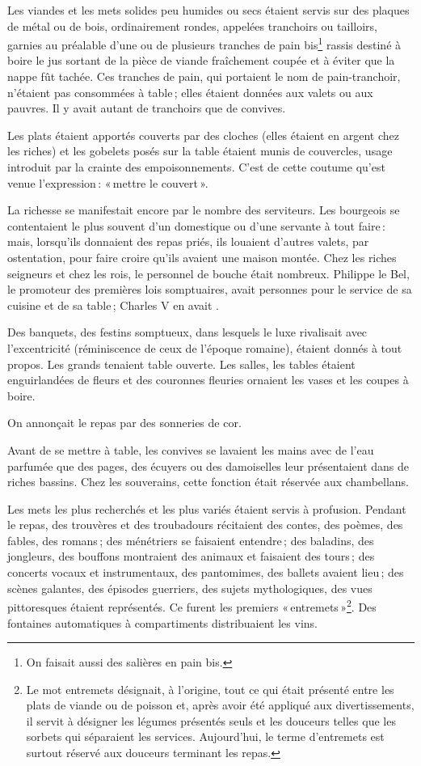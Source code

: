 Les viandes et les mets solides peu humides ou secs étaient servis sur des
plaques de métal ou de bois, ordinairement rondes, appelées tranchoirs ou
tailloirs, garnies au préalable d'une ou de plusieurs tranches de pain
bis\footnote{On faisait aussi des salières en pain bis.} rassis destiné à boire
le jus sortant de la pièce de viande fraîchement coupée et à éviter que la
nappe fût tachée. Ces tranches de pain, qui portaient le nom de pain-tranchoir,
n'étaient pas consommées à table ; elles étaient données aux valets ou aux
pauvres. Il y avait autant de tranchoirs que de convives.

Les plats étaient apportés couverts par des cloches (elles étaient en argent
chez les riches) et les gobelets posés sur la table étaient munis de
couvercles, usage introduit par la crainte des empoisonnements. C'est de cette
coutume qu'est venue l'expression : « mettre le couvert ».

La richesse se manifestait encore par le nombre des serviteurs. Les bourgeois
se contentaient le plus souvent d'un domestique ou d'une servante à tout
faire : mais, lorsqu'ils donnaient des repas priés, ils louaient d’autres
valets, par ostentation, pour faire croire qu'ils avaient une maison montée.
Chez les riches seigneurs et chez les rois, le personnel de bouche était
nombreux. Philippe le Bel, le promoteur des premières lois somptuaires, avait
{\mmm} personnes pour le service de sa cuisine et de sa table ; Charles
V en avait {\mmm}.

Des banquets, des festins somptueux, dans lesquels le luxe rivalisait avec
l'excentricité (réminiscence de ceux de l'époque romaine), étaient donnés
à tout propos. Les grands tenaient table ouverte. Les salles, les tables
étaient enguirlandées de fleurs et des couronnes fleuries ornaient les vases et
les coupes à boire.

On annonçait le repas par des sonneries de cor.

Avant de se mettre à table, les convives se lavaient les mains avec de l'eau
parfumée que des pages, des écuyers ou des damoiselles leur présentaient dans
de riches bassins. Chez les souverains, cette fonction était réservée aux
chambellans.

Les mets les plus recherchés et les plus variés étaient servis à profusion.
Pendant le repas, des trouvères et des troubadours récitaient des contes, des
poèmes, des fables, des romans ; des ménétriers se faisaient entendre ; des
baladins, des jongleurs, des bouffons montraient des animaux et faisaient des
tours ; des concerts vocaux et instrumentaux, des pantomimes, des ballets
avaient lieu ; des scènes galantes, des épisodes guerriers, des sujets
mythologiques, des vues pittoresques étaient représentés. Ce furent les
premiers « entremets »\footnote{Le mot entremets désignait, à l'origine, tout
ce qui était présenté entre les plats de viande ou de poisson et, après avoir
été appliqué aux divertissements, il servit à désigner les légumes présentés
seuls et les douceurs telles que les sorbets qui séparaient les services.
Aujourd'hui, le terme d'entremets est surtout réservé aux douceurs terminant
les repas.}. Des fontaines automatiques à compartiments distribuaient les vins.

